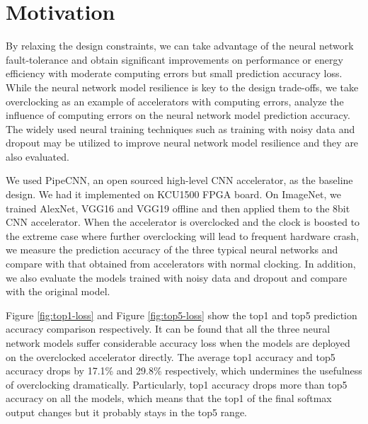 \section{Motivation} \label{sec:motivation}
By relaxing the design constraints, we can take advantage of the neural network 
fault-tolerance and obtain significant improvements on 
performance or energy efficiency with moderate computing errors but small prediction 
accuracy loss. While the neural network model resilience is key to the  
design trade-offs, we take overclocking as an example of accelerators 
with computing errors, analyze the influence of computing errors on 
the neural network model prediction accuracy. The widely used neural 
training techniques such as training with noisy data and dropout may be 
utilized to improve neural network model resilience and they are also 
evaluated.

We used PipeCNN\cite{pipecnn_2}, an open sourced high-level CNN accelerator, 
as the baseline design. We had it implemented on KCU1500 FPGA board. 
On ImageNet, we trained AlexNet, VGG16 and VGG19 offline and then applied 
them to the 8bit CNN accelerator. When the accelerator is overclocked and 
the clock is boosted to the extreme case where 
further overclocking will lead to frequent hardware crash, we measure the prediction accuracy of 
the three typical neural networks and compare with that obtained from accelerators with normal 
clocking. In addition, we also evaluate the models trained with noisy data and dropout and 
compare with the original model.

Figure \ref{fig:top1-loss} and Figure \ref{fig:top5-loss} show the top1 and top5 prediction accuracy comparison 
respectively. It can be found that all the three neural network models suffer considerable accuracy loss 
when the models are deployed on the overclocked accelerator directly. The average top1 accuracy and top5 accuracy 
drops by 17.1\% and 29.8\% respectively, which undermines the usefulness of overclocking dramatically.
Particularly, top1 accuracy drops more than top5 accuracy on all the 
models, which means that the top1 of the final softmax output changes but it probably 
stays in the top5 range. 

